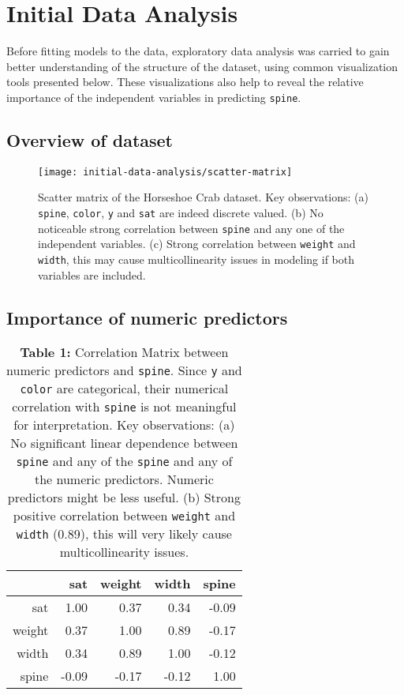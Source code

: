 \documentclass[a4paper, 12pt]{article}
\begin{document}
\section{Initial Data Analysis}
Before fitting models to the data, exploratory data analysis was carried to gain better understanding of the structure of the dataset, using common visualization tools presented below. These visualizations also help to reveal the relative importance of the independent variables in predicting \texttt{spine}.

\subsection{Overview of dataset}
\begin{figure}[H]
\begin{center}
\texttt{[image: initial-data-analysis/scatter-matrix]}
\caption{Scatter matrix of the Horseshoe Crab dataset. Key observations: (a) \texttt{spine}, \texttt{color}, \texttt{y} and \texttt{sat} are indeed discrete valued. (b) No noticeable strong correlation between \texttt{spine} and any one of the independent variables. (c) Strong correlation between \texttt{weight} and \texttt{width}, this may cause multicollinearity issues in modeling if both variables are included.}
\label{scatter-matrix}
\end{center}
\end{figure}

\subsection{Importance of numeric predictors}

\begin{table}[H]
\centering
\begin{tabular}{rrrrr}
  \hline
 & sat & weight & width & spine \\ 
  \hline
sat & 1.00 & 0.37 & 0.34 & -0.09 \\ 
  weight & 0.37 & 1.00 & 0.89 & -0.17 \\ 
  width & 0.34 & 0.89 & 1.00 & -0.12 \\ 
  spine & -0.09 & -0.17 & -0.12 & 1.00 \\ 
   \hline
\end{tabular}
\caption*{\textbf{Table 1:} Correlation Matrix between numeric predictors and \texttt{spine}. Since \texttt{y} and \texttt{color} are categorical, their numerical correlation with \texttt{spine} is not meaningful for interpretation. Key observations: (a) No significant linear dependence between \texttt{spine} and any of the \texttt{spine} and any of the numeric predictors. Numeric predictors might be less useful. (b) Strong positive correlation between \texttt{weight} and \texttt{width} (0.89), this will very likely cause multicollinearity issues.}
\label{tab:correlation-matrix}
\end{table}
\end{document}
